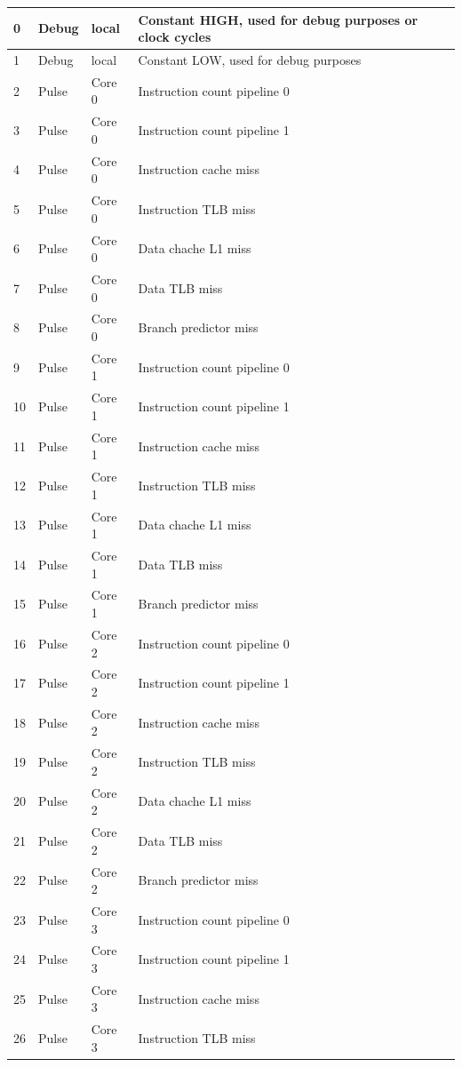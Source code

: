 \begin{table}[H]
\begin{footnotesize}
\begin{tabular}{|l|l|l|l|l|}
\hline
0 & Debug & local &  Constant HIGH, used for debug purposes or clock cycles \\
\hline 
1 & Debug & local &  Constant LOW, used for debug purposes \\
\hline 
2 & Pulse & Core 0 &  Instruction count pipeline 0 \\
\hline 
3 & Pulse & Core 0 &  Instruction count pipeline 1 \\
\hline 
4 & Pulse & Core 0 &  Instruction cache miss \\
\hline 
5 & Pulse & Core 0 &  Instruction TLB miss \\
\hline 
6 & Pulse & Core 0 &  Data chache L1 miss \\
\hline 
7 & Pulse & Core 0 &  Data TLB miss \\
\hline 
8 & Pulse & Core 0 &  Branch predictor miss \\
\hline 
9 & Pulse & Core 1 &  Instruction count pipeline 0 \\
\hline 
10 & Pulse & Core 1 &  Instruction count pipeline 1 \\
\hline 
11 & Pulse & Core 1 &  Instruction cache miss \\
\hline 
12 & Pulse & Core 1 &  Instruction TLB miss \\
\hline 
13 & Pulse & Core 1 &  Data chache L1 miss \\
\hline 
14 & Pulse & Core 1 &  Data TLB miss \\
\hline 
15 & Pulse & Core 1 &  Branch predictor miss \\
\hline 
16 & Pulse & Core 2 &  Instruction count pipeline 0 \\
\hline 
17 & Pulse & Core 2 &  Instruction count pipeline 1 \\
\hline 
18 & Pulse & Core 2 &  Instruction cache miss \\
\hline 
19 & Pulse & Core 2 &  Instruction TLB miss \\
\hline 
20 & Pulse & Core 2 &  Data chache L1 miss \\
\hline 
21 & Pulse & Core 2 &  Data TLB miss \\
\hline 
22 & Pulse & Core 2 &  Branch predictor miss \\
\hline 
23 & Pulse & Core 3 &  Instruction count pipeline 0 \\
\hline 
24 & Pulse & Core 3 &  Instruction count pipeline 1 \\
\hline 
25 & Pulse & Core 3 &  Instruction cache miss \\
\hline 
26 & Pulse & Core 3 &  Instruction TLB miss \\

\end{tabular}
\end{footnotesize}
\end{table}

